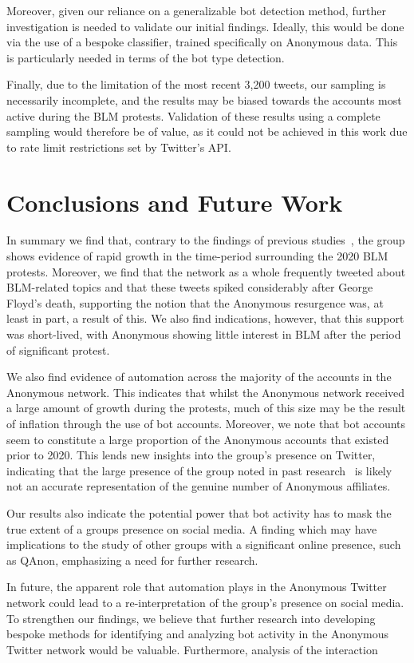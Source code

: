 \documentclass[letterpaper]{article}
\begin{document}
Moreover, given our reliance on a generalizable bot detection method, further investigation is needed to validate our initial findings. Ideally, this would be done via the use of a bespoke classifier, trained specifically on Anonymous data. This is particularly needed in terms of the bot type detection.

Finally, due to the limitation of the most recent 3,200 tweets, our sampling is necessarily incomplete, and the results may be biased towards the accounts most active during the BLM protests. Validation of these results using a complete sampling would therefore be of value, as it could not be achieved in this work due to rate limit restrictions set by Twitter's API.

\vspace{-0.99mm}
\vspace{-1.68mm}
\section{Conclusions and Future Work}

In summary we find that, contrary to the findings of previous studies~\cite{Jones2020,Uitermark2017}, the group shows evidence of rapid growth in the time-period surrounding the 2020 BLM protests. Moreover, we find that the network as a whole frequently tweeted about BLM-related topics and that these tweets spiked considerably after George Floyd's death, supporting the notion that the Anonymous resurgence was, at least in part, a result of this. We also find indications, however, that this support was short-lived, with Anonymous showing little interest in BLM after the period of significant protest.

We also find evidence of automation across the majority of the accounts in the Anonymous network. This indicates that whilst the Anonymous network received a large amount of growth during the protests, much of this size may be the result of inflation through the use of bot accounts. Moreover, we note that bot accounts seem to constitute a large proportion of the Anonymous accounts that existed prior to 2020. This lends new insights into the group's presence on Twitter, indicating that the large presence of the group noted in past research~\cite{Jones2020} is likely not an accurate representation of the genuine number of Anonymous affiliates.

Our results also indicate the potential power that bot activity has to mask the true extent of a groups presence on social media. A finding which may have implications to the study of other groups with a significant online presence, such as QAnon, emphasizing a need for further research.

In future, the apparent role that automation plays in the Anonymous Twitter network could lead to a re-interpretation of the group's presence on social media. To strengthen our findings, we believe that further research into developing bespoke methods for identifying and analyzing bot activity in the Anonymous Twitter network would be valuable. Furthermore, analysis of the interaction


\fontsize{9.0pt}{10.0pt}
\selectfont
\clearpage

\end{document}
